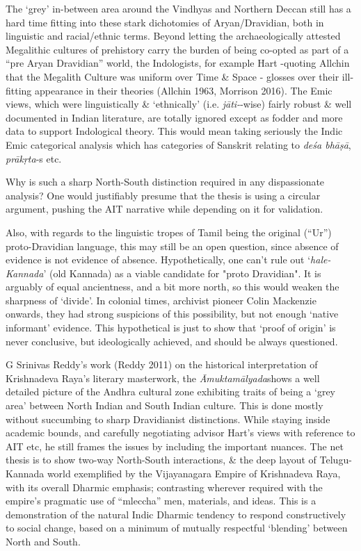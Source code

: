 The ‘grey’ in-between area around the Vindhyas and Northern Deccan still has a hard time fitting into these stark dichotomies of Aryan/Dravidian, both in linguistic and racial/ethnic terms. Beyond letting the archaeologically attested Megalithic cultures of prehistory carry the burden of being co-opted as part of a “pre Aryan Dravidian” world, the Indologists, for example Hart -quoting Allchin that the Megalith Culture was uniform over Time \& Space - glosses over their ill-fitting appearance in their theories (Allchin 1963, Morrison 2016). The Emic views, which were linguistically \& ‘ethnically’ (i.e. \textit{jāti-}-wise) fairly robust \& well documented in Indian literature, are totally ignored except as fodder and more data to support Indological theory. This would mean taking seriously the Indic Emic categorical analysis which has categories of Sanskrit relating to \textit{deśa bhāṣā}, \textit{prākṛta}-s etc.

Why is such a sharp North-South distinction required in any dispassionate analysis? One would justifiably presume that the thesis is using a circular argument, pushing the AIT narrative while depending on it for validation.

Also, with regards to the linguistic tropes of Tamil being the original (“Ur”) proto-Dravidian language, this may still be an open question, since absence of evidence is not evidence of absence. Hypothetically, one can’t rule out ‘\textit{hale-Kannada}’ (old Kannada) as a viable candidate for "proto Dravidian". It is arguably of equal ancientness, and a bit more north, so this would weaken the sharpness of ‘divide’. In colonial times, archivist pioneer Colin Mackenzie onwards, they had strong suspicions of this possibility, but not enough ‘native informant’ evidence. This hypothetical is just to show that ‘proof of origin’ is never conclusive, but ideologically achieved, and should be always questioned.

G Srinivas Reddy’s work (Reddy 2011) on the historical interpretation of Krishnadeva Raya’s literary masterwork, the \textit{Āmuktamālyada}shows a well detailed picture of the Andhra cultural zone exhibiting traits of being a ‘grey area’ between North Indian and South Indian culture. This is done mostly without succumbing to sharp Dravidianist distinctions. While staying inside academic bounds, and carefully negotiating advisor Hart’s views with reference to AIT etc, he still frames the issues by including the important nuances. The net thesis is to show two-way North-South interactions, \& the deep layout of Telugu-Kannada world exemplified by the Vijayanagara Empire of Krishnadeva Raya, with its overall Dharmic emphasis; contrasting wherever required with the empire’s pragmatic use of “mleccha” men, materials, and ideas. This is a demonstration of the natural Indic Dharmic tendency to respond constructively to social change, based on a minimum of mutually respectful ‘blending’ between North and South.


